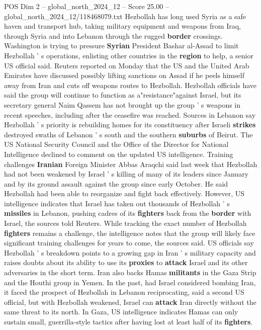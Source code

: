 \begin{textsample}{POS Dim 2 – global\_north\_2024\_12 – Score 25.00 – global\_north\_2024\_12/118468079.txt}
Hezbollah has long used Syria as a safe haven and transport hub, taking military equipment and weapons from Iraq, through Syria and into Lebanon through the rugged \textbf{border} crossings.
Washington is trying to pressure \textbf{Syrian} President Bashar al-Assad to limit Hezbollah ' s operations, enlisting other countries in the \textbf{region} to help, a senior US official said.
Reuters reported on Monday that the US and the United Arab Emirates have discussed possibly lifting sanctions on Assad if he peels himself away from Iran and cuts off weapons routes to Hezbollah.
Hezbollah officials have said the group will continue to function as a"resistance"against Israel, but its secretary general Naim Qassem has not brought up the group ' s weapons in recent speeches, including after the ceasefire was reached.
Sources in Lebanon say Hezbollah ' s priority is rebuilding homes for its constituency after Israeli \textbf{strikes} destroyed swaths of Lebanon ' s south and the southern \textbf{suburbs} of Beirut.
The US National Security Council and the Office of the Director for National Intelligence declined to comment on the updated US intelligence.
Training challenges \textbf{Iranian} Foreign Minister Abbas Araqchi said last week that Hezbollah had not been weakened by Israel ' s killing of many of its leaders since January and by its ground assault against the group since early October.
He said Hezbollah had been able to reorganize and fight back effectively.
However, US intelligence indicates that Israel has taken out thousands of Hezbollah ' s \textbf{missiles} in Lebanon, pushing cadres of its \textbf{fighters} back from the \textbf{border} with Israel, the sources told Reuters.
While tracking the exact number of Hezbollah \textbf{fighters} remains a challenge, the intelligence notes that the group will likely face significant training challenges for years to come, the sources said.
US officials say Hezbollah ' s breakdown points to a growing gap in Iran ' s military capacity and raises doubts about its ability to use its \textbf{proxies} to \textbf{attack} Israel and its other adversaries in the short term.
Iran also backs Hamas \textbf{militants} in the Gaza Strip and the Houthi group in Yemen.
In the past, had Israel considered bombing Iran, it faced the prospect of Hezbollah in Lebanon reciprocating, said a second US official, but with Hezbollah weakened, Israel can \textbf{attack} Iran directly without the same threat to its north.
In Gaza, US intelligence indicates Hamas can only sustain small, guerrilla-style tactics after having lost at least half of its \textbf{fighters}.

\end{textsample}
